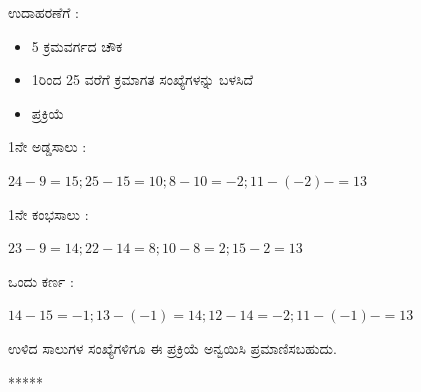 ಉದಾಹರಣೆಗೆ :
\begin{itemize}
	\item 5 ಕ್ರಮವರ್ಗದ ಚೌಕ
	\item 1ರಿಂದ 25 ವರೆಗೆ ಕ್ರಮಾಗತ ಸಂಖ್ಯೆಗಳನ್ನು ಬಳಸಿದೆ
	\item ಪ್ರಕ್ರಿಯೆ
\end{itemize}

1ನೇ ಅಡ್ಡಸಾಲು :

$24-9=15; 25-15=10; 8-10=-2; 11-(-2)-= \boxed{13}$

1ನೇ ಕಂಭಸಾಲು :

$23-9=14; 22-14=8; 10-8=2; 15-2= \boxed{13}$

ಒಂದು ಕರ್ಣ :

$14-15=-1; 13-(-1)=14; 12-14=-2; 11-(-1)-= \boxed{13}$

ಉಳಿದ ಸಾಲುಗಳ ಸಂಖ್ಯೆಗಳಿಗೂ ಈ ಪ್ರಕ್ರಿಯೆ ಅನ್ವಯಿಸಿ ಪ್ರಮಾಣಿಸಬಹುದು.
\begin{center}
*****
\end{center}
